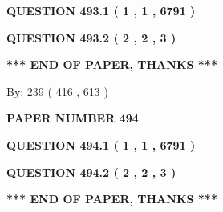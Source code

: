 \documentclass[12pt]{article}
\begin{document}
\vspace{0.2in}
  
{\textbf{\Large{QUESTION
493.1 
 ( 1 , 1 , 6791 )
}}}
  
  
  
\vspace{0.2in}
  
{\textbf{\Large{QUESTION
493.2 
 ( 2 , 2 , 3 )
}}}
  
  
   
   
 \vspace{0.2in}
 
   
   
   
   
\vspace{1.0in} 
{\textbf{\large{ *** END OF PAPER, THANKS *** }}} 
   
   
\hspace{1.0in} By: 
 239 ( 416 ,  613 )
   
   
   
   
\newpage 
\setcounter{page}{ 
   494001 } 
   
   
   
   
 {\textbf{ \Large{ PAPER NUMBER  494  }}}
   
   
\vspace{0.2in}
   
   
   
   
   
   
 \vspace{0.2in}
 
 
 
 
   
   
  
\vspace{0.2in}
  
{\textbf{\Large{QUESTION
494.1 
 ( 1 , 1 , 6791 )
}}}
  
  
  
\vspace{0.2in}
  
{\textbf{\Large{QUESTION
494.2 
 ( 2 , 2 , 3 )
}}}
  
  
   
   
 \vspace{0.2in}
 
   
   
   
   
\vspace{1.0in} 
{\textbf{\large{ *** END OF PAPER, THANKS *** }}} 
   
\end{document}
